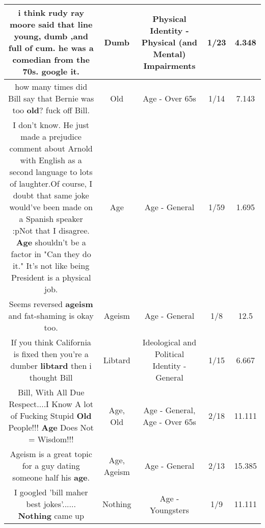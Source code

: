 \documentclass[11pt]{article}
\newlength\mylength
\begin{document}
\begin{center}
\begin{longtable}{|C{.65\mylength}|C{.30\mylength}|C{.12\mylength}|C{.12\mylength}|C{.12\mylength}|}
  \small i think rudy ray  moore  said that line young, \textbf{dumb} ,and full of cum. he was a comedian from the 70s. google it.\normalsize   & Dumb & Physical Identity - Physical (and Mental) Impairments & 1/23 & 4.348 \\  \hline
  \small how many times did Bill say that Bernie was too \textbf{old}? fuck off Bill.\normalsize   & Old & Age - Over 65s & 1/14 & 7.143 \\  \hline
  \small I don't know.  He just made a prejudice comment about Arnold with English as a second language to lots of laughter.Of course, I doubt that same joke would've been made on a Spanish speaker :pNot that I disagree.  \textbf{Age} shouldn't be a factor in "Can they do it."  It's not like being President is a physical job.\normalsize   & Age & Age - General & 1/59 & 1.695 \\  \hline
  \small Seems reversed \textbf{ageism} and fat-shaming is okay too.\normalsize   & Ageism & Age - General & 1/8 & 12.5 \\  \hline
  \small If you think California is fixed then you're a dumber \textbf{libtard} then i thought Bill\normalsize   & Libtard &  Ideological and Political Identity - General & 1/15 & 6.667 \\  \hline
  \small Bill, With All Due Respect....I Know A lot of Fucking Stupid \textbf{Old} People!!! \textbf{Age} Does Not = Wisdom!!!\normalsize   & Age, Old & Age - General, Age - Over 65s & 2/18 & 11.111 \\  \hline
  \small Ageism is  a great topic for a guy dating someone half his \textbf{age}.\normalsize   & Age, Ageism & Age - General & 2/13 & 15.385 \\  \hline
  \small I googled 'bill maher best jokes'...... \textbf{Nothing} came up\normalsize   & Nothing & Age - Youngsters & 1/9 & 11.111 \\  \hline

\end{longtable}
\end{center}
\end{document}
